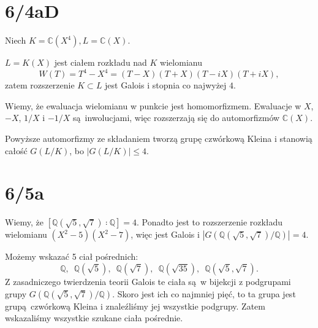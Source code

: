 \documentclass[a4paper, 12pt]{article}
\newcommand{\+}{\enspace}
\begin{document}
\section*{6/4aD}
Niech $K=ℂ(X^4), L=ℂ(X)$.

$L=K(X)$ jest ciałem rozkładu nad $K$ wielomianu
$$W(T) = T^4-X^4 = (T-X)(T+X)(T-iX)(T+iX),$$
zatem rozszerzenie $K⊂L$ jest Galois i stopnia co najwyżej $4$.

Wiemy, że ewaluacja wielomianu w punkcie jest homomorfizmem.
Ewaluacje w $X$, $-X$, $1/X$ i $-1/X$ są inwolucjami, więc rozszerzają się
do automorfizmów $ℂ(X)$.

Powyższe automorfizmy ze składaniem tworzą grupę czwórkową Kleina
i stanowią całość $G(L/K)$, bo $|G(L/K)| ≤ 4$.

\iffalse
\subsection*{(b)}
Niech $K=ℚ$ i $L=ℚ(\sqrt[4]{2}, i)$.
Zauważmy, że $ℚ(\sqrt[4]{2},i) ⊇ ℚ(i\sqrt[4]{2})$.
Zachodzi też zawieranie w drugą stronę, bo
4
$i = \frac{(i\sqrt[4]{2})^4}{2}$ i $\sqrt[4]{2} = \frac{i\sqrt[4]{2}}{i}$.

$L$ jest ciałem rozkładu nad $K$ wielomianu
$$W(X) = X^4-2 = (X-\sqrt[4]{2})(X-i\sqrt[4]{2})(X+\sqrt[4]{2})(X+i\sqrt[4]{2}),$$
zatem rozszerzenie $K⊂L$ jest Galois i stopnia co najwyżej $4$.
\fi

\section*{6/5a}
Wiemy, że $[ℚ(\sqrt{5}, \sqrt{7}) ∶ ℚ] = 4$.
Ponadto jest to rozszerzenie rozkładu wielomianu $(X^2-5)(X^2-7)$,
więc jest Galois i $|G(ℚ(\sqrt{5}, \sqrt{7})/ℚ)| = 4$.

Możemy wskazać 5 ciał pośrednich:
$$ℚ,\+ ℚ(\sqrt{5}),\+ ℚ(\sqrt{7}),\+ ℚ(\sqrt{35}),\+ ℚ(\sqrt{5}, \sqrt{7}).$$
Z zasadniczego twierdzenia teorii Galois te ciała są w bijekcji z
podgrupami grupy $G(ℚ(\sqrt{5}, \sqrt{7})/ℚ)$.
Skoro jest ich co najmniej pięć, to ta grupa jest grupą czwórkową Kleina
i znaleźliśmy jej wszystkie podgrupy.
Zatem wskazaliśmy wszystkie szukane ciała pośrednie.
\end{document}
